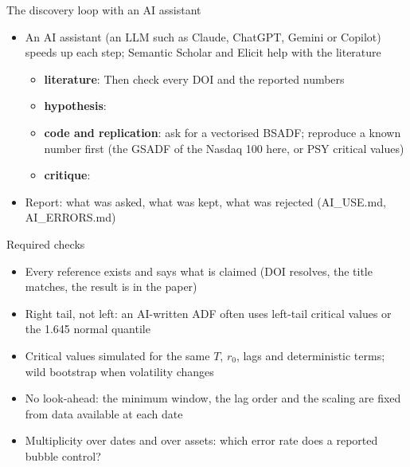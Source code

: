 \begin{frame}{The discovery loop with an AI assistant}
\itemsize{\footnotesize}
\begin{itemize}
    \item An AI assistant (an LLM such as Claude, ChatGPT, Gemini or Copilot) speeds up each step; Semantic Scholar and Elicit help with the literature
    \begin{itemize}
        \item \textbf{literature}:  Then check every DOI and the reported numbers
        \item \textbf{hypothesis}: 
        \item \textbf{code and replication}: ask for a vectorised BSADF; reproduce a known number first (the GSADF of the Nasdaq 100 here, or PSY critical values)
        \item \textbf{critique}: 
    \end{itemize}
    \item Report: what was asked, what was kept, what was rejected (AI\_USE.md, AI\_ERRORS.md)
\end{itemize}
\end{frame}

\begin{frame}{Required checks}
\itemsize{\small}
\begin{itemize}
    \item Every reference exists and says what is claimed (DOI resolves, the title matches, the result is in the paper)
    \item Right tail, not left: an AI-written ADF often uses left-tail critical values or the 1.645 normal quantile
    \item Critical values simulated for the same $T$, $r_0$, lags and deterministic terms; wild bootstrap when volatility changes
    \item No look-ahead: the minimum window, the lag order and the scaling are fixed from data available at each date
    \item Multiplicity over dates and over assets: which error rate does a reported bubble control?
\end{itemize}
\end{frame}

